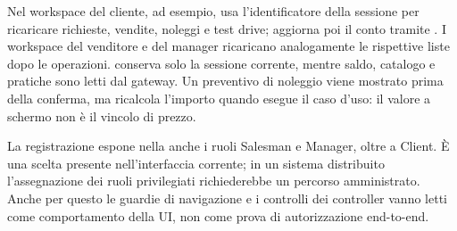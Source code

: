 Nel workspace del cliente, ad esempio,  usa l'identificatore della sessione per ricaricare richieste, vendite, noleggi e test drive; aggiorna poi il conto tramite . I workspace del venditore e del manager ricaricano analogamente le rispettive liste dopo le operazioni.  conserva solo la sessione corrente, mentre saldo, catalogo e pratiche sono letti dal gateway. Un preventivo di noleggio viene mostrato prima della conferma, ma  ricalcola l'importo quando esegue il caso d'uso: il valore a schermo non è il vincolo di prezzo.

La registrazione espone nella  anche i ruoli Salesman e Manager, oltre a Client. È una scelta presente nell'interfaccia corrente; in un sistema distribuito l'assegnazione dei ruoli privilegiati richiederebbe un percorso amministrato. Anche per questo le guardie di navigazione e i controlli dei controller vanno letti come comportamento della UI, non come prova di autorizzazione end-to-end.
